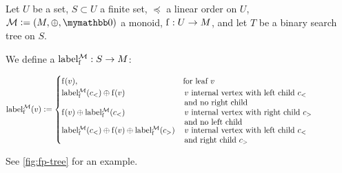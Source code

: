 \begin{definition}
Let $U$ be a set, $S \subset U$ a finite set, $\preceq$ a linear order on $U$, $\mathcal{M} \defeq (M, \groupaddsym, \neutraladd)$ a monoid, ${\operatorname{f}}: {U} \rightarrow {M}$, and let $T$ be a binary search tree on $S$.

We define a  ${\operatorname{label_{\operatorname{f}}^{\mathcal{M}}}}: {S} \rightarrow {M}$:

  \[
   \liftlabel{\f}{\mathcal{M}}(v) \defeq \begin{cases}
\f(v), &  \text{for leaf $v$} \\
\groupadd{\liftlabel{\f}{\mathcal{M}}(c_{<})}{\f(v)} & \, \parbox[t]{.6\textwidth}{$v$ internal vertex with left child $c_{<}$\\and no right child}\\
\groupadd{\f(v)}{\liftlabel{\f}{\mathcal{M}}(c_{<})} & \, \parbox[t]{.6\textwidth}{$v$ internal vertex with right child $c_{>}$\\and no left child}\\
\groupadd{\liftlabel{\f}{\mathcal{M}}(c_{<})}{\groupadd{\f(v)}{\liftlabel{\f}{\mathcal{M}}(c_{>})}} & \, \parbox[t]{.6\textwidth}{$v$ internal vertex with left child $c_{<}$\\and right child $c_{>}$}
\end{cases}
  \]

See \cref{fig:fp-tree} for an example.
\end{definition}


